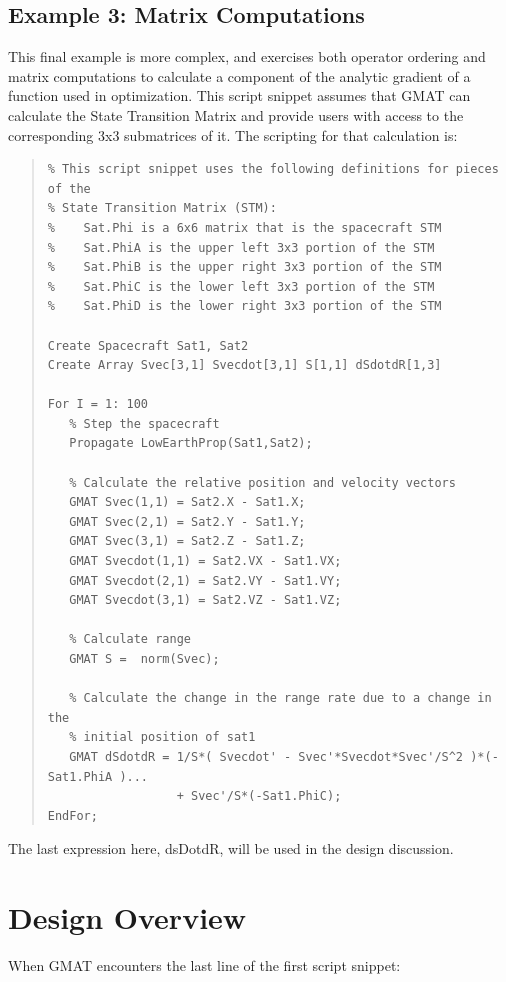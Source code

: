 \subsection*{Example 3: Matrix Computations}

This final example is more complex, and exercises both operator ordering and
matrix computations to calculate a component of the analytic gradient of a
function used in optimization.  This script snippet assumes that GMAT can
calculate the State Transition Matrix and provide users with access to the
corresponding 3x3 submatrices of it.  The scripting for that calculation is:

\begin{quote}
\begin{verbatim}
% This script snippet uses the following definitions for pieces of the
% State Transition Matrix (STM):
%    Sat.Phi is a 6x6 matrix that is the spacecraft STM
%    Sat.PhiA is the upper left 3x3 portion of the STM
%    Sat.PhiB is the upper right 3x3 portion of the STM
%    Sat.PhiC is the lower left 3x3 portion of the STM
%    Sat.PhiD is the lower right 3x3 portion of the STM

Create Spacecraft Sat1, Sat2
Create Array Svec[3,1] Svecdot[3,1] S[1,1] dSdotdR[1,3]

For I = 1: 100
   % Step the spacecraft
   Propagate LowEarthProp(Sat1,Sat2);

   % Calculate the relative position and velocity vectors
   GMAT Svec(1,1) = Sat2.X - Sat1.X;
   GMAT Svec(2,1) = Sat2.Y - Sat1.Y;
   GMAT Svec(3,1) = Sat2.Z - Sat1.Z;
   GMAT Svecdot(1,1) = Sat2.VX - Sat1.VX;
   GMAT Svecdot(2,1) = Sat2.VY - Sat1.VY;
   GMAT Svecdot(3,1) = Sat2.VZ - Sat1.VZ;

   % Calculate range
   GMAT S =  norm(Svec);

   % Calculate the change in the range rate due to a change in the
   % initial position of sat1
   GMAT dSdotdR = 1/S*( Svecdot' - Svec'*Svecdot*Svec'/S^2 )*(- Sat1.PhiA )...
                  + Svec'/S*(-Sat1.PhiC);
EndFor;
\end{verbatim}
\end{quote}

\noindent The last expression here, dsDotdR, will be used in the design
discussion.

\section{Design Overview}

When GMAT encounters the last line of the first script snippet:

